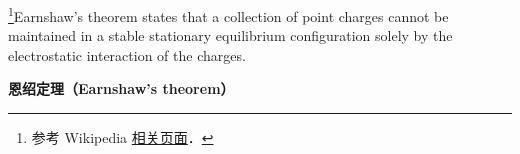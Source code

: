 
\footnote{参考 Wikipedia \href{https://en.wikipedia.org/wiki/Earnshaw's_theorem}{相关页面}．}Earnshaw's theorem states that a collection of point charges cannot be maintained in a stable stationary equilibrium configuration solely by the electrostatic interaction of the charges.

\textbf{恩绍定理（Earnshaw's theorem）}
